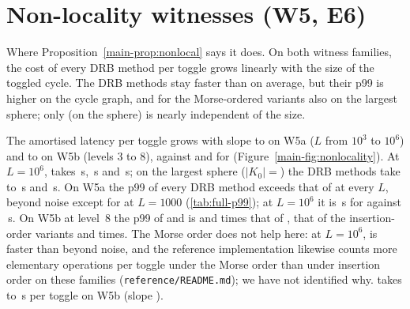 \section{Non-locality witnesses (W5, E6)}\label{sec:s-nonlocal}\label{sec:e6}


Where Proposition~\ref{main-prop:nonlocal} says it does. On both witness families, the cost of
every DRB method per toggle grows linearly with the size of the toggled cycle.
The DRB methods stay faster than  on average, but their p99 is
higher on the cycle graph, and for the Morse-ordered variants also on the
largest sphere; only  (on the sphere) is nearly independent of the
size.

The amortised latency per toggle grows with slope
\NumSlopeESixWFiveCycleDrbIdAmort{} to \NumSlopeESixWFiveCycleDrbIdRbAmort{}
on W5a ($L$ from $10^3$ to $10^6$) and \NumSlopeESixWFiveSphereDrbIdRbAmort{} to
\NumSlopeESixWFiveSphereMmhmAmort{} on W5b (levels 3 to 8), against
\NumSlopeESixWFiveCycleFullIdAmort{} and \NumSlopeESixWFiveSphereFullIdAmort{}
for  (Figure~\ref{main-fig:nonlocality}). At $L=10^6$, 
takes \NumWFiveCycleLOneMillionDrbIdAmort\,\textmu s, 
\NumWFiveCycleLOneMillionMmhmAmort\,\textmu s and 
\NumWFiveCycleLOneMillionFullIdAmort\,\textmu s; on the largest sphere
($|K_0|={}$\NumWFiveSphereLEightSize) the DRB methods take
\NumWFiveSphereLEightDrbIdAmort{} to \NumWFiveSphereLEightMmhmNorbAmort\,\textmu s
and  \NumWFiveSphereLEightFullIdAmort\,\textmu s. On W5a the p99
of every DRB method exceeds that of  at every $L$, beyond noise
except for  at $L=1000$ (\cref{tab:full-p99}); at $L=10^6$ it is
\NumWFiveCycleLOneMillionMmhmPNinetyNine\,\textmu s for  against
\NumWFiveCycleLOneMillionFullIdPNinetyNine\,\textmu s. On W5b at level~8 the p99
of  and  is \NumWFiveSphereLEightMmhmPNinetyNineOverFullId{}
and \NumWFiveSphereLEightMmhmNorbPNinetyNineOverFullId{} times that of
, that of the insertion-order variants
\NumWFiveSphereLEightDrbIdPNinetyNineOverFullId{} and
\NumWFiveSphereLEightDrbIdRbPNinetyNineOverFullId{} times. The Morse order does
not help here: at $L=10^6$,  is faster than  beyond
noise, and the reference implementation likewise counts more elementary
operations per toggle under the Morse order than under insertion order on these
families (\texttt{reference/README.md}); we have not identified why.
 takes \NumWFiveSphereLThreeEulerAmort{} to
\NumWFiveSphereLEightEulerAmort\,\textmu s per toggle on W5b (slope
\NumSlopeESixWFiveSphereEulerAmort).


